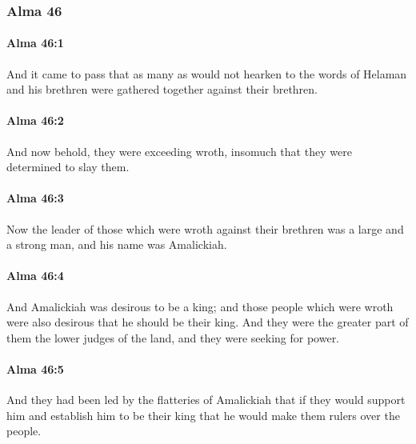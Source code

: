 	\subsubsection{Alma 46} %
		\label{ALMA-46}
		
		\paragraph{Alma 46:1} %
			\label{ALMA-46-1}

			And it came to pass that
			as many as would not hearken to the words of Helaman and his brethren
			were gathered together against their brethren.

		\paragraph{Alma 46:2} %
			\label{ALMA-46-2}

			And now behold, they were exceeding wroth,
			insomuch that they were determined to slay them.

		\paragraph{Alma 46:3} %
			\label{ALMA-46-3}

			Now the leader of those which were wroth against their brethren
			was a large and a strong man,
			and his name was Amalickiah.

		\paragraph{Alma 46:4} %
			\label{ALMA-46-4}

			And Amalickiah was desirous to be a king;
			and those people which were wroth were also desirous
			that he should be their king.
			And they were the greater part of them the lower judges of the land,
			and they were seeking for power.

		\paragraph{Alma 46:5} %
			\label{ALMA-46-5}

			And they had been led by the flatteries of Amalickiah
			that if they would support him and establish him to be their king
			that he would make them rulers over the people.

